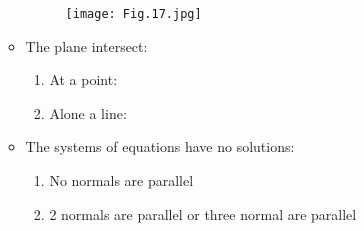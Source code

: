 \documentclass[12pt, a4paper]{article}
\begin{document}
\begin{enumerate}
\begin{itemize}
    \begin{figure}[H]
      \centering
      \texttt{[image: Fig.17.jpg]}
    \end{figure}
    \item The plane intersect: 
    \begin{enumerate}
      \item At a point: {\color{green}{the system of equations will have a unique solution.}}
      \item Alone a line: {\color{green}{the system of equations will have infinitely many solutions}}
    \end{enumerate}
    \item The systems of equations have no solutions: 
    \begin{enumerate}
      \item No normals are parallel {\color{green}{(the planes from a prism)}}
      \item 2 normals are parallel or three normal are parallel {\color{green}{(the planes are parallel)}}
    \end{enumerate}
  \end{itemize}
\end{enumerate}
\end{document}
